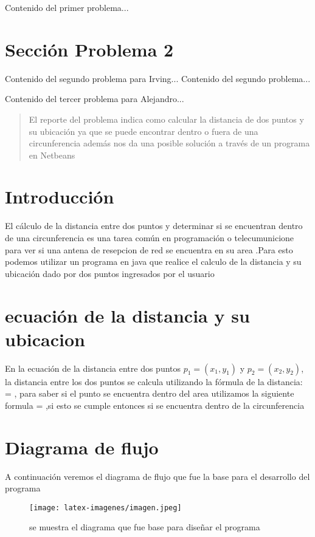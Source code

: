 \documentclass{IEEEcsmag}
\begin{document}
\newpage
Contenido del primer problema...
\newpage


\section{Sección Problema 2}
Contenido del segundo problema para Irving...
\newpage
Contenido del segundo problema...
\newpage


Contenido del tercer problema para Alejandro...
\newpage 
\begin{abstract}
    
    El reporte del problema indica como calcular la distancia de dos puntos y su ubicación ya que se puede encontrar dentro o fuera de una circunferencia además nos da una posible solución a través de un programa en Netbeans
\end{abstract}





\section{Introducción}
El cálculo de la distancia entre dos puntos y determinar si se encuentran dentro de una circunferencia es una tarea común en programación o telecumunicione para ver si una antena de resepcion de red se encuentra en su area .Para esto podemos utilizar un programa en java que realice el calculo de la distancia y su ubicación dado por dos puntos ingresados por el usuario 
\section{ecuación de la distancia y su ubicacion}
En la ecuación de la distancia entre dos puntos $p_1 = (x_1, y_1)$ y $p_2 = (x_2, y_2)$, la distancia entre los dos puntos se calcula utilizando la fórmula de la distancia:
 = , para saber si el punto se encuentra dentro del area utilizamos la siguiente formula
 = ,si esto se cumple entonces si se encuentra dentro de la circunferencia



\section{Diagrama de flujo}
A continuación veremos el diagrama de flujo que fue la base para el desarrollo del programa
\begin{figure}[h!]
    \centering
    \texttt{[image: latex-imagenes/imagen.jpeg]}
    \caption{se muestra el diagrama que fue base para diseñar el programa}
    \label{fig:diagrama de flujo}
\end{figure}
\end{document}
